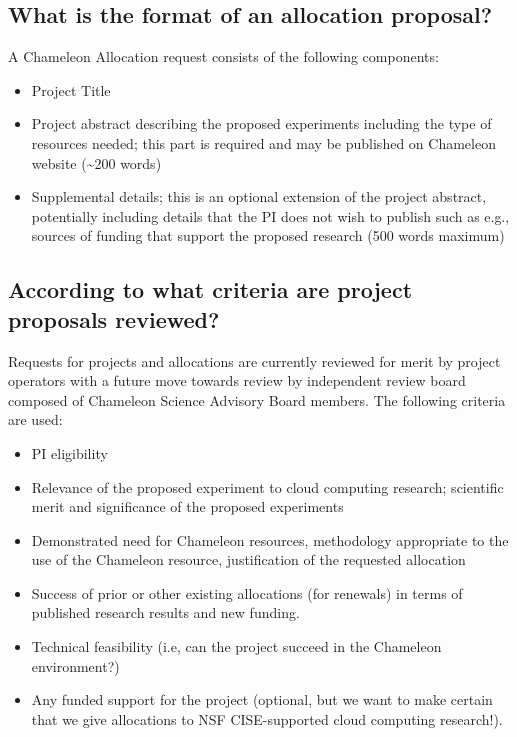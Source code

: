 \subsection{What is the format of an allocation
proposal?}\label{what-is-the-format-of-an-allocation-proposal}

A Chameleon Allocation request consists of the following components:

\begin{itemize}

\item
  Project Title
\item
  Project abstract describing the proposed experiments including the
  type of resources needed; this part is required and may be published
  on Chameleon website (\textasciitilde{}200 words)
\item
  Supplemental details; this is an optional extension of the project
  abstract, potentially including details that the PI does not wish to
  publish such as e.g., sources of funding that support the proposed
  research (500 words maximum)
\end{itemize}

\subsection{According to what criteria are project proposals
reviewed?}\label{according-to-what-criteria-are-project-proposals-reviewed}

Requests for projects and allocations are currently reviewed for merit
by project operators with a future move towards review by independent
review board composed of Chameleon Science Advisory Board members. The
following criteria are used:

\begin{itemize}

\item
  PI eligibility
\item
  Relevance of the proposed experiment to cloud computing research;
  scientific merit and significance of the proposed experiments
\item
  Demonstrated need for Chameleon resources, methodology appropriate to
  the use of the Chameleon resource, justification of the requested
  allocation
\item
  Success of prior or other existing allocations (for renewals) in terms
  of published research results and new funding.
\item
  Technical feasibility (i.e, can the project succeed in the Chameleon
  environment?)
\item
  Any funded support for the project (optional, but we want to make
  certain that we give allocations to NSF CISE-supported cloud computing
  research!).
\end{itemize}

